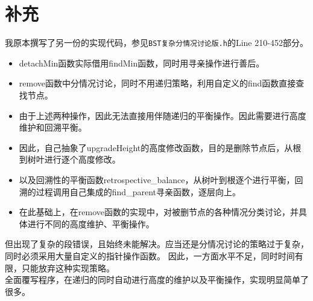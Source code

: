 \documentclass[UTF8]{ctexart}
\begin{document}
\section{补充}
我原本撰写了另一份的实现代码，参见\texttt{BST复杂分情况讨论版.h}的Line 210-452部分。
\begin{itemize}
    \item detachMin函数实际借用findMin函数，同时用寻亲操作进行善后。
    \item remove函数中分情况讨论，同时不用递归策略，利用自定义的find函数直接查找节点。
    \item 由于上述两种操作，因此无法直接用伴随递归的平衡操作。因此需要进行高度维护和回溯平衡。
    \item 因此，自己抽象了upgradeHeight的高度修改函数，目的是删除节点后，从根到树叶进行逐个高度修改。
    \item 以及回溯性的平衡函数retrospective\_balance，从树叶到根逐个进行平衡，回溯的过程调用自己集成的find\_parent寻亲函数，逐层向上。
    \item 在此基础上，在remove函数的实现中，对被删节点的各种情况分类讨论，并具体进行不同的高度维护、平衡操作。
\end{itemize}
但出现了复杂的段错误，且始终未能解决。应当还是分情况讨论的策略过于复杂，同时必须采用大量自定义的指针操作函数。
因此，一方面水平不足，同时时间有限，只能放弃这种实现策略。\\
全面覆写程序，在递归的同时自动进行高度的维护以及平衡操作，实现明显简单了很多。
\end{document}
